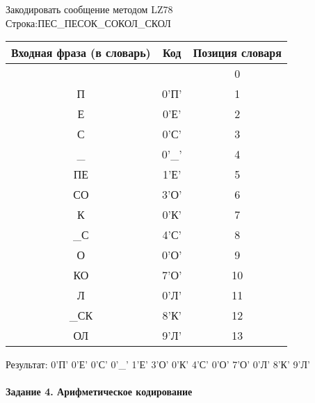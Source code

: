 \documentclass[a4paper, 12pt]{article}
\begin{document}
Закодировать сообщение методом LZ78\\
Строка:ПЕС\_ПЕСОК\_СОКОЛ\_СКОЛ\\
\begin{table}[h!]
\centering
\begin{tabular}{|c|c|c|} 
\hline
 Входная фраза (в словарь) & Код & Позиция словаря \\ \hline

 &  & 0 \\ \hline
П & 0'П' & 1 \\ \hline
Е & 0'Е' & 2 \\ \hline
С & 0'С' & 3 \\ \hline
\_ & 0'\_' & 4 \\ \hline
ПЕ & 1'Е' & 5 \\ \hline
СО & 3'О' & 6 \\ \hline
К & 0'К' & 7 \\ \hline
\_С & 4'С' & 8 \\ \hline
О & 0'О' & 9 \\ \hline
КО & 7'О' & 10 \\ \hline
Л & 0'Л' & 11 \\ \hline
\_СК & 8'К' & 12 \\ \hline
ОЛ & 9'Л' & 13 \\ \hline
\end{tabular}
\end{table}

Результат: 0'П' 0'Е' 0'С' 0'\_' 1'Е' 3'О' 0'К' 4'С' 0'О' 7'О' 0'Л' 8'К' 9'Л'\\
\pagebreak
\paragraph{Задание 4. Арифметическое кодирование\\}
\end{document}
